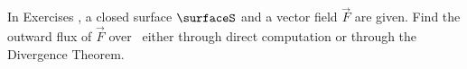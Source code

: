 {\noindent In Exercises}
{, a closed surface $\surfaceS$ and a vector field $\vec F$ are given. Find the outward flux of $\vec F$ over \surfaceS\ either through direct computation or through the Divergence Theorem.
}
